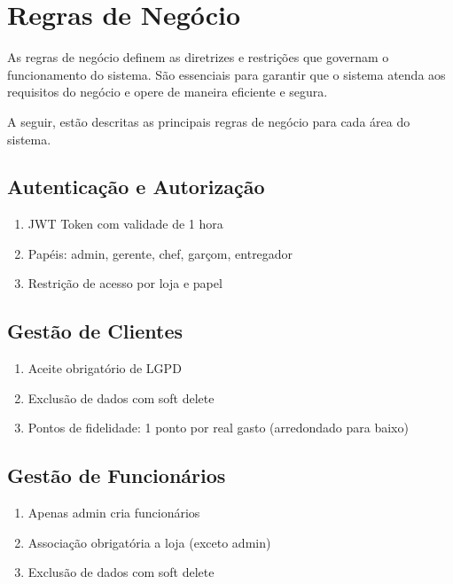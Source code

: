 \section{Regras de Negócio}

\hspace{0.5cm} As regras de negócio definem as diretrizes e restrições que governam o funcionamento do sistema.
São essenciais para garantir que o sistema atenda aos requisitos do negócio e opere de maneira eficiente e segura.

A seguir, estão descritas as principais regras de negócio para cada área do sistema.

\subsection{Autenticação e Autorização}
\label{subsec:auth}

\begin{enumerate}[topsep=1pt, itemsep=0pt]
  \item JWT Token com validade de 1 hora
  \item Papéis: admin, gerente, chef, garçom, entregador
  \item Restrição de acesso por loja e papel
\end{enumerate}

\subsection{Gestão de Clientes}
\label{subsec:client}

\begin{enumerate}[topsep=1pt, itemsep=0pt]
  \item Aceite obrigatório de LGPD
  \item Exclusão de dados com soft delete
  \item Pontos de fidelidade: 1 ponto por real gasto (arredondado para baixo)
\end{enumerate}

\subsection{Gestão de Funcionários}
\label{subsec:employee}

\begin{enumerate}[topsep=1pt, itemsep=0pt]
  \item Apenas admin cria funcionários
  \item Associação obrigatória a loja (exceto admin)
  \item Exclusão de dados com soft delete
\end{enumerate}

